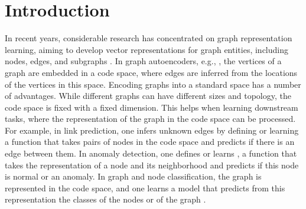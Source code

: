 \documentclass[letterpaper]{article} %
\newcommand{\ron}[1]{{{\textcolor{red}{\textbf{[Ron:} {#1}\textbf{]}}}}}
\begin{document}
%


\section{Introduction}

In recent years, considerable research has concentrated on graph representation learning, aiming to develop vector representations for graph entities, including nodes, edges, and subgraphs \cite{hamilton2017representation,GRL_survet2020}. In graph autoencoders, e.g.,  \cite{kipf2016variational,grover2019graphite,JMLR:v21:19-671,mehta2019stochastic}, the vertices of a graph are embedded in a code space, where edges are inferred from the locations of the vertices in this space. Encoding graphs into a standard space has a number of advantages. While different graphs can have different sizes and topology, the code space is fixed with a fixed dimension. This helps when  learning downstream tasks, where the representation of the graph in the code space can be processed. For example, in link prediction, one infers unknown edges by defining \cite{kipf2016variational} or learning \cite{kumar2020linkreview} a function that takes pairs of nodes in the code space and predicts if there is an edge between them. In anomaly detection, one defines \cite{ding2019dominant,fan2020anomalydae} or learns \cite{chen2020gaan,ding2021aegis},  a function that takes the representation of a node and its neighborhood and predicts if this node is normal or an anomaly. In graph and node classification, the graph is represented in the code space, and one learns a model that predicts from this representation the classes of the nodes or of the graph \cite{GCN,MPNN}. %
\end{document}
